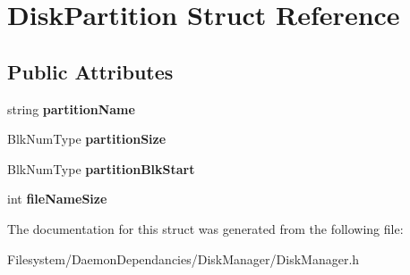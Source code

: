 \hypertarget{structDiskPartition}{}\section{Disk\+Partition Struct Reference}
\label{structDiskPartition}
\subsection*{Public Attributes}
\begin{DoxyCompactItemize}
\item 
\mbox{\label{structDiskPartition_a8c89b5f115fa534a3cb5d76505de97cb}} 
string {\bfseries partition\+Name}
\item 
\mbox{\label{structDiskPartition_a61dfe31b8baf361738168c2521c19286}} 
Blk\+Num\+Type {\bfseries partition\+Size}
\item 
\mbox{\label{structDiskPartition_a2b5b89e7739ffa6ac21772a92f88e35f}} 
Blk\+Num\+Type {\bfseries partition\+Blk\+Start}
\item 
\mbox{\label{structDiskPartition_a6fd44394d9d8bf83fa61cfd12be25412}} 
int {\bfseries file\+Name\+Size}
\end{DoxyCompactItemize}


The documentation for this struct was generated from the following file\+:\begin{DoxyCompactItemize}
\item 
Filesystem/\+Daemon\+Dependancies/\+Disk\+Manager/Disk\+Manager.\+h\end{DoxyCompactItemize}
